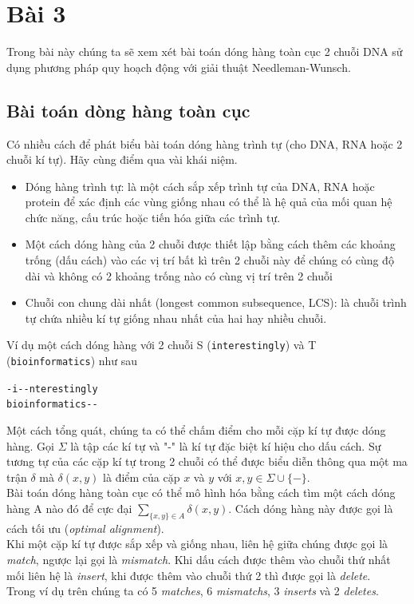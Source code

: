 \section{Bài 3}
Trong bài này chúng ta sẽ xem xét bài toán dóng hàng
toàn cục 2 chuỗi DNA sử dụng phương pháp quy hoạch động 
với giải thuật Needleman-Wunsch.

\subsection{Bài toán dòng hàng toàn cục}
Có nhiều cách để phát biểu bài toán dóng hàng trình tự 
(cho DNA, RNA hoặc 2 chuỗi kí tự). Hãy cùng điểm qua vài khái niệm.

\begin{itemize}
    \item Dóng hàng trình tự: là một cách sắp xếp trình tự của DNA,
    RNA hoặc protein để xác định các vùng giống nhau có thể là
    hệ quả của mối quan hệ chức năng, cấu trúc hoặc tiến hóa giữa
    các trình tự.
    \item Một cách dóng hàng của 2 chuỗi được thiết lập bằng cách thêm
    các khoảng trống (dấu cách) vào các vị trí bất kì trên 2 chuỗi này
    để chúng có cùng độ dài và không có 2 khoảng trống nào có cùng vị trí 
    trên 2 chuỗi
    \item Chuỗi con chung dài nhất (longest common subsequence, LCS):
    là chuỗi trình tự chứa nhiều kí tự giống nhau nhất của hai hay
    nhiều chuỗi.
\end{itemize}
Ví dụ một cách dóng hàng với 2 chuỗi S (\lstinline{interestingly}) 
và T (\lstinline{bioinformatics}) như sau
\begin{center}
    \lstinline{-i--nterestingly} \\
    \lstinline{bioinformatics--}
\end{center}

Một cách tổng quát, chúng ta có thể chấm điểm cho mỗi cặp kí tự được dóng hàng.
Gọi $\Sigma$ là tập các kí tự và "-" là kí tự đặc biệt kí hiệu cho dấu cách. 
Sự tương tự của các cặp kí tự trong 2 chuỗi có thể được biểu diễn thông qua 
một ma trận $\delta$ mà $\delta(x,y)$ là điểm của cặp $x$ và $y$ với 
$x, y \in \Sigma \cup \{-\}$. \\
Bài toán dóng hàng toàn cục có thể mô hình hóa bằng cách tìm một cách dóng hàng A
nào đó để cực đại $\sum_{\{x, y \} \in A} \delta(x,y)$. Cách dóng hàng này được
gọi là cách tối ưu (\textit{optimal alignment}). \\
Khi một cặp kí tự được sắp xếp và giống nhau, liên hệ giữa chúng
 được gọi là \textit{match}, ngược
lại gọi là \textit{mismatch}. Khi dấu cách được thêm vào chuỗi thứ nhất mối liên hệ 
là \textit{insert}, khi được thêm vào chuỗi thứ 2 thì được gọi là \textit{delete}. \\
Trong ví dụ trên chúng ta có 5 \textit{matches}, 6 \textit{mismatchs}, 3 \textit{inserts}
và 2 \textit{deletes}.

